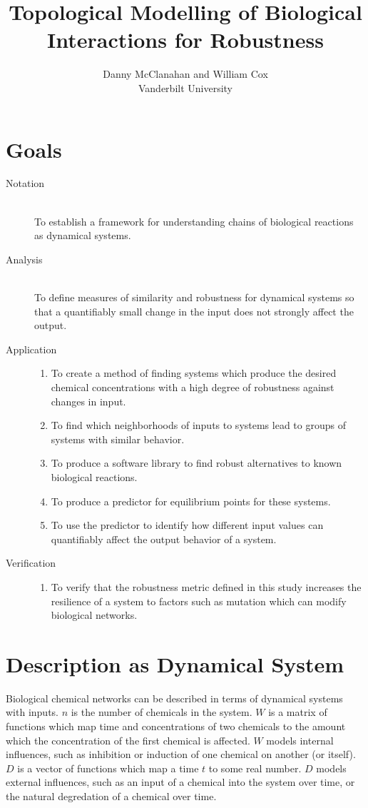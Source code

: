 \documentclass{article}
\title{Topological Modelling of Biological Interactions for Robustness}
\author{Danny McClanahan and William Cox \\
Vanderbilt University}
\date{}
\begin{document}
\maketitle
\vspace{-25pt}

\section{Goals}
\begin{description}
\item[Notation] \hfill \\
  To establish a framework for understanding chains of biological reactions as dynamical systems.
\item[Analysis] \hfill \\
  To define measures of similarity and robustness for dynamical systems so that a quantifiably small change in the input does not strongly affect the output.
\item[Application] \hfill
  \begin{enumerate}
  \item To create a method of finding systems which produce the desired chemical concentrations with a high degree of robustness against changes in input.
  \item To find which neighborhoods of inputs to systems lead to groups of systems with similar behavior.
  \item To produce a software library to find robust alternatives to known biological reactions.
  \item To produce a predictor for equilibrium points for these systems.
  \item To use the predictor to identify how different input values can quantifiably affect the output behavior of a system.
  \end{enumerate}
\item[Verification] \hfill
  \begin{enumerate}
  \item To verify that the robustness metric defined in this study increases the resilience of a system to factors such as mutation which can modify biological networks.
  \end{enumerate}
\end{description}

\section{Description as Dynamical System} \label{description}
Biological chemical networks can be described in terms of dynamical systems with inputs. $n$ is the number of chemicals in the system. $W$ is a matrix of functions which map time and concentrations of two chemicals to the amount which the concentration of the first chemical is affected. $W$ models internal influences, such as inhibition or induction of one chemical on another (or itself). $D$ is a vector of functions which map a time $t$ to some real number. $D$ models external influences, such as an input of a chemical into the system over time, or the natural degredation of a chemical over time.
\end{document}
